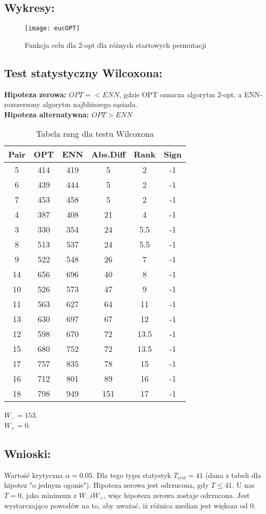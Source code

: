   \subsection{Wykresy: }
  \begin{figure}[H]
      \texttt{[image: eucOPT]}
      \centering
      \caption{Funkcja celu dla 2-opt dla różnych startowych permutacji}
    \end{figure}



  \subsection{Test statystyczny Wilcoxona: }
    \textbf{Hipoteza zerowa: $OPT =< ENN$}, gdzie OPT oznacza algorytm 2-opt, a ENN- rozszerzony algorytm najbliższego sąsiada. \\
    \textbf{Hipoteza alternatywna: $OPT > ENN$ }
    \begin{table}
    \begin{tabular}{|c | c | c | c | c | c |} 
     \hline
     Pair & OPT & ENN & Abs.Diff & Rank & Sign \\ [0.5ex] 
     \hline\hline
      5 & 414 & 419 & 5 & 2 & -1 \\
      6 & 439 & 444 & 5 & 2 & -1 \\
      7 & 453 & 458 & 5 & 2 & -1 \\
      4 & 387 & 408 & 21 & 4 & -1 \\
      3 & 330 & 354 & 24 & 5.5 & -1 \\
      8 & 513 & 537 & 24 & 5.5 & -1 \\
      9 & 522 & 548 & 26 & 7 & -1 \\
      14 & 656 & 696 & 40 & 8 & -1 \\
      10 & 526 & 573 & 47 & 9 & -1 \\
      11 & 563 & 627 & 64 & 11 & -1 \\
      13 & 630 & 697 & 67 & 12 & -1 \\
      12 & 598 & 670 & 72 & 13.5 & -1 \\
      15 & 680& 752 & 72 & 13.5 & -1 \\
      17 & 757 & 835 & 78 & 15 & -1 \\
      16 & 712 & 801 & 89 & 16 & -1 \\
      18 & 798 & 949 & 151 & 17 & -1 \\
     \hline
    \end{tabular}
    \caption{Tabela rang dla testu Wilcoxona}
    \end{table}

    $W_{-} = 153$.\\
    $W_{+} = 0$. \\
  \subsection{Wnioski: }
    Wartość krytyczna $\alpha = 0.05$. Dla tego typu statystyk $T_{crit}=41$ (dana z tabeli dla hipotez "o jednym ogonie"). Hipoteza zerowa jest odrzucona, gdy $ T \leq 41 $. U nas $T=0$, jako minimum z $W_{-} i W_{+}$, więc hipoteza zerowa zostaje odrzucona. Jest wystarczająco powodów na to, aby uważać, iż różnica median jest większa od 0. 